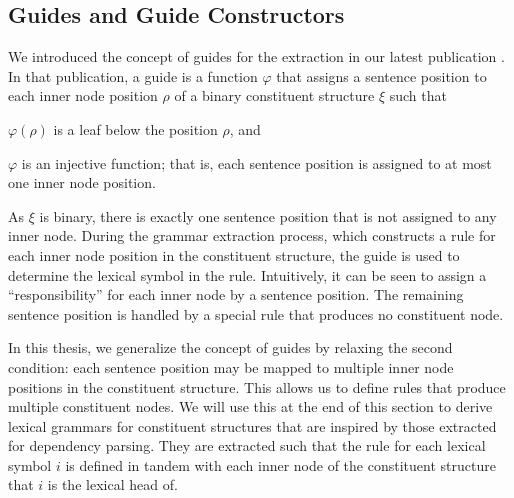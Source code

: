 \documentclass[../../document.tex]{subfiles}
\begin{document}
    \subsection{Guides and Guide Constructors}\label{sec:guides}
    We introduced the concept of guides for the extraction in our latest publication \citep{Rup22}.
    In that publication, a guide is a function \(\varphi\) that assigns a sentence position to each inner node position \(\rho\) of a binary constituent structure \(\xi\) such that
    \begin{inparaenum}
        \item \(\varphi(\rho)\) is a leaf below the position \(\rho\), and
        \item \(\varphi\) is an injective function; that is, each sentence position is assigned to at most one inner node position.
    \end{inparaenum}
    As \(\xi\) is binary, there is exactly one sentence position that is not assigned to any inner node.
    During the grammar extraction process, which constructs a rule for each inner node position in the constituent structure, the guide is used to determine the lexical symbol in the rule.
    Intuitively, it can be seen to assign a ``responsibility'' for each inner node by a sentence position.
    The remaining sentence position is handled by a special rule that produces no constituent node.

    In this thesis, we generalize the concept of guides by relaxing the second condition: each sentence position may be mapped to multiple inner node positions in the constituent structure.
    This allows us to define rules that produce multiple constituent nodes.
    We will use this at the end of this section to derive lexical grammars for constituent structures that are inspired by those extracted for dependency parsing.
    They are extracted such that the rule for each lexical symbol \(i\) is defined in tandem with each inner node of the constituent structure that \(i\) is the lexical head of.
\end{document}
